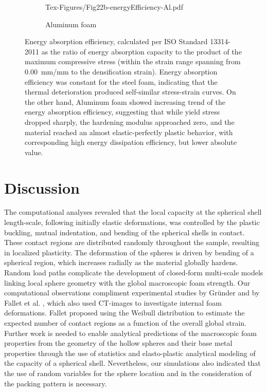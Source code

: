 \documentclass[review]{elsarticle}
\begin{document}
\begin{figure}
\begin{subfigure}{0.50\textwidth}
		{Tex-Figures/Fig22b-energyEfficiency-Al.pdf}
		\caption{Aluminum foam}
		\label{fig:energyEfficiency_Al}
	\end{subfigure}
	\caption{ Energy absorption efficiency, calculated per ISO Standard 13314-2011 as the ratio of energy absorption capacity to the product of the maximum compressive stress (within the strain range spanning from 0.00~mm/mm to the densification strain). Energy absorption efficiency was constant for the steel foam, indicating that the thermal deterioration produced self-similar stress-strain curves. On the other hand, Aluminum foam showed increasing trend of the energy absorption efficiency, suggesting that while yield stress dropped sharply, the hardening modulus approached zero, and the material reached an almost elastic-perfectly plastic behavior, with corresponding high energy dissipation efficiency, but lower absolute value.}
	\label{fig:energyEfficiency}
\end{figure}

\section{Discussion}

The computational analyses revealed that the local capacity at the spherical shell length-scale, following initially elastic deformations, was controlled by the plastic buckling, mutual indentation, and bending of the spherical shells in contact. These contact regions are distributed randomly throughout the sample, resulting in localized plasticity. The deformation of the spheres is driven by bending of a spherical region, which increases radially as the material globally hardens. Random load paths complicate the development of closed-form multi-scale models linking local sphere geometry with the global macroscopic foam strength. Our computational observations compliment experimental studies by Gr\"{u}nder \cite{grunder_modeling_2001} and by Fallet et al. \cite{Fallet2008}, which also used CT-images to investigate internal foam deformations. Fallet proposed using the Weibull distribution to estimate the expected number of contact regions as a function of the overall global strain. Further work is needed to enable analytical predictions of the macroscopic foam properties from the geometry of the hollow spheres and their base metal properties through the use of statistics and elasto-plastic analytical modeling of the capacity of a spherical shell. Nevertheless, our simulations also indicated that the use of random variables for the sphere location and in the consideration of the packing pattern is necessary.
\end{document}
